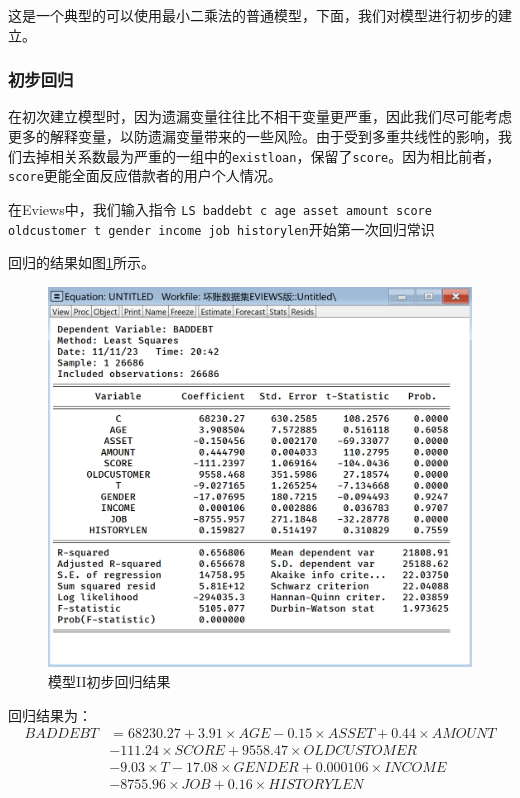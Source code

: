 \documentclass[13.5pt,hyperref,a4paper,UTF8]{ctexart}
\begin{document}
这是一个典型的可以使用最小二乘法的普通模型，下面，我们对模型进行初步的建立。

\subsubsection{初步回归}

在初次建立模型时，因为遗漏变量往往比不相干变量更严重，因此我们尽可能考虑更多的解释变量，以防遗漏变量带来的一些风险。由于受到多重共线性的影响，我们去掉相关系数最为严重的一组中的\texttt{existloan}，保留了\texttt{score}。因为相比前者，\texttt{score}更能全面反应借款者的用户个人情况。

在Eviews中，我们输入指令 \texttt{LS baddebt c age asset amount score oldcustomer t gender income job historylen}开始第一次回归常识

回归的结果如图\ref{第一次回归模型}所示。

\begin{figure}[H]
    \centering
    \includegraphics[width=1\linewidth]{figures//3回归//回归2/第一次回归结果.png}
    \caption{模型II初步回归结果}
    \label{第一次回归模型}
\end{figure}

回归结果为：
\begin{equation}
\begin{split}
 BADDEBT &= 68230.27+ 3.91\times AGE - 0.15\times ASSET + 0.44\times AMOUNT \\ & - 111.24\times SCORE + 9558.47\times OLDCUSTOMER \\ & - 9.03\times T - 17.08\times GENDER + 0.000106\times INCOME \\ & - 8755.96\times JOB + 0.16\times HISTORYLEN
\end{split}
\end{equation}
\end{document}
